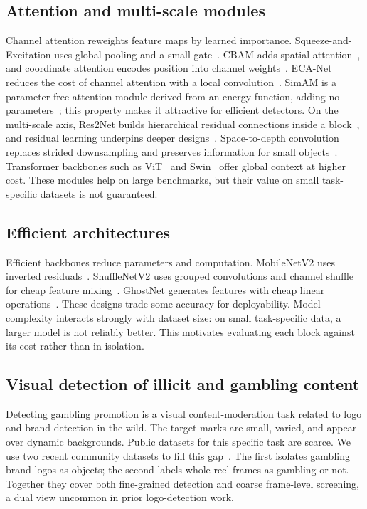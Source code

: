 \documentclass[preprint,review,12pt]{elsarticle}
\begin{document}
\subsection{Attention and multi-scale modules}
Channel attention reweights feature maps by learned importance.
Squeeze-and-Excitation uses global pooling and a small
gate~\cite{hu2018squeeze}. CBAM adds spatial attention~\cite{woo2018cbam}, and
coordinate attention encodes position into channel
weights~\cite{hou2021coordinate}. ECA-Net reduces the cost of channel attention
with a local convolution~\cite{wang2020eca}. SimAM is a parameter-free attention
module derived from an energy function, adding no
parameters~\cite{yang2021simam}; this property makes it attractive for efficient
detectors. On the multi-scale axis, Res2Net builds hierarchical residual
connections inside a block~\cite{gao2021res2net}, and residual learning
underpins deeper designs~\cite{he2016deep}. Space-to-depth convolution replaces
strided downsampling and preserves information for small
objects~\cite{sunkara2022no}. Transformer backbones such as
ViT~\cite{dosovitskiy2021image} and Swin~\cite{liu2021swin} offer global
context at higher cost. These modules help on large benchmarks, but their value
on small task-specific datasets is not guaranteed.

\subsection{Efficient architectures}
Efficient backbones reduce parameters and computation. MobileNetV2 uses inverted
residuals~\cite{sandler2018mobilenetv2}. ShuffleNetV2 uses grouped convolutions
and channel shuffle for cheap feature mixing~\cite{ma2018shufflenet}. GhostNet
generates features with cheap linear operations~\cite{han2020ghostnet}. These
designs trade some accuracy for deployability. Model complexity interacts
strongly with dataset size: on small task-specific data, a larger model is not
reliably better. This motivates evaluating each block against its cost rather
than in isolation.

\subsection{Visual detection of illicit and gambling content}
Detecting gambling promotion is a visual content-moderation task related to logo
and brand detection in the wild. The target marks are small, varied, and appear
over dynamic backgrounds. Public datasets for this specific task are scarce. We
use two recent community datasets to fill this
gap~\cite{dataset_v21_roboflow, dataset_judi3k_kaggle}. The first isolates
gambling brand logos as objects; the second labels whole reel frames as gambling
or not. Together they cover both fine-grained detection and coarse frame-level
screening, a dual view uncommon in prior logo-detection work.
\end{document}
